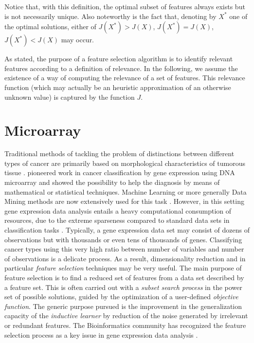 \documentclass{article}
\begin{document}
Notice that, with this definition, the optimal subset of features
always exists but is not necessarily unique. Also noteworthy is the
fact that, denoting by $X^*$ one of the optimal solutions, either of
$J(X^*) > J(X)$, $J(X^*) = J(X)$, $J(X^*) < J(X)$ may occur.

As stated, the purpose of a feature selection algorithm is to identify
relevant features according to a definition of relevance. In the
following, we assume the existence of a way of computing the relevance
of a set of features. This relevance function (which may actually be
an heuristic approximation of an otherwise unknown value) is captured by the
function $J$.

\section{Microarray}
Traditional methods of tackling the problem of distinctions between
different types of cancer are primarily based on morphological
characteristics of tumorous tissue \cite{Chuf05}. \cite{Go99}
pioneered work in cancer classification by gene expression using DNA
microarray and showed the possibility to help the diagnosis by means
of mathematical or statistical techniques. Machine Learning or more
generally Data Mining methods are now extensively used for this task
\cite{Bo05}. However, in this setting gene expression data analysis
entails a heavy computational consumption of resources, due to the
extreme sparseness compared to standard data sets in classification
tasks \cite{Tan07}. Typically, a gene expression data set may consist
of dozens of observations but with thousands or even tens of thousands
of genes. Classifying cancer types using this very high ratio between
number of variables and number of observations is a delicate process.
As a result, dimensionality reduction and in particular \emph{feature
  selection} techniques may be very useful. The main purpose of
feature selection is to find a reduced set of features from a data set
described by a feature set. This is often carried out with a {\em
  subset search process} in the power set of possible solutions,
guided by the optimization of a user-defined {\em objective function}.
The generic purpose pursued is the improvement in the generalization
capacity of the \emph{inductive learner} by reduction of the noise
generated by irrelevant or redundant features. The Bioinformatics
community has recognized the feature selection process as a key issue
in gene expression data analysis \cite{Gian07}.
\end{document}
